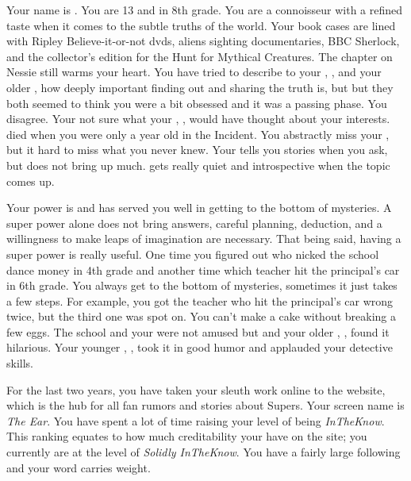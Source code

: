 \documentclass[char]{LRSguildcamp1}
\begin{document}
\name{\cTween{}}


Your name is \cTween{\intro}. You are 13 and in 8th grade. You are a connoisseur with a refined taste when it comes to the subtle truths of the world. Your book cases are lined with Ripley Believe-it-or-not dvds, aliens sighting documentaries,  BBC Sherlock, and the collector's edition for the Hunt for Mythical Creatures. The chapter on Nessie still warms your heart. You have tried to describe to your \cArchitect{\parent}, \cArchitect{}, and your older \cTeen{\sibling}, \cTeen{} how deeply important finding out and sharing the truth is, but but they both seemed to think you were a bit obsessed and it was a passing phase.
You disagree. Your not sure what your \cAS{\parent}, \cAS{}, would have thought about your interests. \cAS{\They} died when you were only a year old in the \pCityO{} Incident. You abstractly miss your \cAS{\parent}, but it hard to miss what you never knew. Your \cArchitect{\parent} tells you stories when you ask, but does not bring \cAS{\them} up much. \cTeen{} gets really quiet and introspective when the topic comes up. 

Your power is \cTween{\MYsuperpower} and has served you well in getting to the bottom of mysteries. A super power alone does not bring answers, careful planning, deduction, and a willingness to make leaps of imagination are necessary. That being said, having a super power is really useful. One time you figured out who nicked the school dance money in 4th grade and another time which teacher hit the principal's car in 6th grade. You always get to the bottom of mysteries, sometimes it just takes a few steps. For example, you got the teacher who hit the principal's car wrong twice, but the third one was spot on. You can't make a cake without breaking a few eggs. The school and your \cArchitect{\parent} were not amused but \cGrandma{} and your older \cOldest{\uncle}, \cOldest{}, found it hilarious. Your younger \cYoungest{\uncle}, \cYoungest{}, took it in good humor and applauded your detective skills.

For the last two years, you have taken your sleuth work online to the \pTweenwebsite{} website, which is the hub for all fan rumors and stories about Supers. Your screen name is \textit{The Ear}. You have spent a lot of time raising your level of being \textsl{InTheKnow}. This ranking equates to how much creditability your have on the site; you currently are at the level of \textsl{Solidly InTheKnow}. You have a fairly large following and your word carries weight. 
\end{document}
